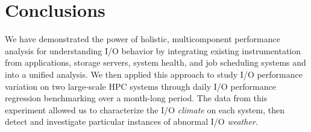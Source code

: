 \section{Conclusions} \label{sec:conclusions}

We have demonstrated the power of holistic, multicomponent performance analysis for understanding I/O behavior by integrating existing instrumentation from applications, storage servers, system health, and job scheduling systems and into a unified analysis.
We then applied this approach to study I/O performance variation on two large-scale HPC systems through daily I/O performance regression benchmarking over a month-long period.
The data from this experiment allowed us to characterize the I/O \emph{climate} on each system, then detect and investigate particular instances of abnormal I/O \emph{weather}.

